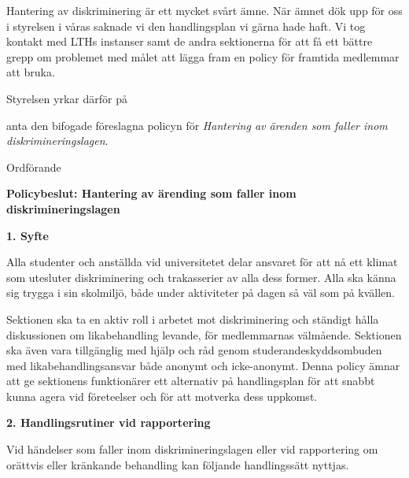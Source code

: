 \documentclass[../_main/handlingar.tex]{subfiles}
\begin{document}

Hantering av diskriminering är ett mycket svårt ämne. När ämnet dök upp för oss i styrelsen i våras saknade vi den handlingsplan vi gärna hade haft. 
Vi tog kontakt med LTHs instanser samt de andra sektionerna för att få ett bättre grepp om problemet med målet att lägga fram en policy för framtida medlemmar att bruka. 

Styrelsen yrkar därför på

\begin{attsatser}
    \att anta den bifogade föreslagna policyn för \textit{Hantering av ärenden som faller inom diskrimineringslagen}.
\end{attsatser}

\begin{signatures}{1}
    \ist
    \signature{\ordf}{Ordförande}
\end{signatures}

\newpage
{\Large \textbf{Policybeslut: Hantering av ärending som faller inom diskrimineringslagen}}

{\large \textbf{1. Syfte}}

Alla studenter och anställda vid universitetet delar ansvaret för att nå ett klimat som utesluter diskriminering och trakasserier av alla dess former. Alla ska känna sig trygga i sin skolmiljö, både under aktiviteter på dagen så väl som på kvällen.

Sektionen ska ta en aktiv roll i arbetet mot diskriminering och ständigt hålla diskussionen om likabehandling levande, för medlemmarnas välmående. Sektionen ska även vara tillgänglig med hjälp och råd genom studerandeskyddsombuden med likabehandlingsansvar både anonymt och icke-anonymt. Denna policy ämnar att ge sektionens funktionärer ett alternativ på handlingsplan för att snabbt kunna agera vid företeelser och för att motverka dess uppkomst.

{\large \textbf{2. Handlingsrutiner vid rapportering}}

Vid händelser som faller inom diskrimineringslagen eller vid rapportering om orättvis eller kränkande behandling kan följande handlingssätt nyttjas.
\end{document}

